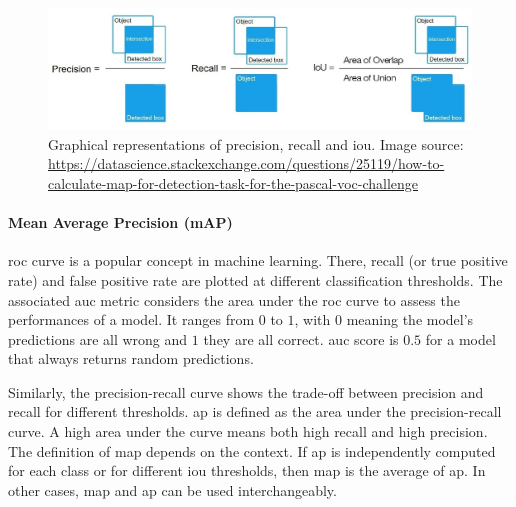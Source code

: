 \documentclass[%
    corpo=12pt,
    twoside,
    stile=classica,   
    tipotesi=magistrale,
    evenboxes,
    english,
	numerazioneromana,
]{toptesi}
\begin{document}
\begin{figure}[t]
	\centering
	\includegraphics[width=\linewidth]{imgs/precision_recall_iou.jpg}
	\caption[Graphical representations of precision, recall and \gls{iou}]{Graphical representations of precision, recall and \gls{iou}. Image source: \url{https://datascience.stackexchange.com/questions/25119/how-to-calculate-map-for-detection-task-for-the-pascal-voc-challenge}}
	\label{fig:iou}
\end{figure}

\paragraph{Mean Average Precision (mAP)}
\gls{roc} curve is a popular concept in machine learning. There, recall (or true positive rate) and false positive rate are plotted at different classification thresholds. The associated \gls{auc} metric considers the area under the \gls{roc} curve to assess the performances of a model\cite{roc}. It ranges from $ 0 $ to $ 1 $, with $ 0 $ meaning the model's predictions are all wrong and $ 1 $ they are all correct. \Gls{auc} score is $ 0.5 $ for a model that always returns random predictions.

\medskip
Similarly, the precision-recall curve shows the trade-off between precision and recall for different thresholds\cite{precrecall}. \gls{ap} is defined as the area under the precision-recall curve. A high area under the curve means both high recall and high precision. The definition of \gls{map} depends on the context. If \gls{ap} is independently computed for each class or for different \gls{iou} thresholds, then \gls{map} is the average of \gls{ap}. In other cases, \gls{map} and \gls{ap} can be used interchangeably.
\end{document}
